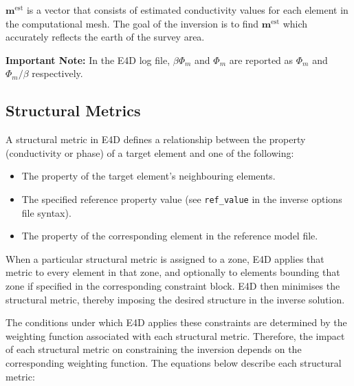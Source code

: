 \documentclass[a4paper,12pt]{article}
\begin{document}
\(\mathbf{m}^{\text{est}}\) is a vector that consists of estimated conductivity values for each element in the computational mesh. The goal of the inversion is to find \(\mathbf{m}^{\text{est}}\) which accurately reflects the earth of the survey area.

\begin{framed}
\noindent \textbf{Important Note:} In the E4D log file, $\beta \Phi_m$ and $\Phi_m$ are reported as $\Phi_m$ and $\Phi_m / \beta$ respectively.
\end{framed}

\subsection{Structural Metrics} \label{structural_metrics}

A structural metric in E4D defines a relationship between the property (conductivity or phase) of a target element and one of the following:

\begin{itemize}
    \item The property of the target element's neighbouring elements.
    \item The specified reference property value (see \texttt{ref\_value} in the inverse options file syntax).
    \item The property of the corresponding element in the reference model file.
\end{itemize}

When a particular structural metric is assigned to a zone, E4D applies that metric to every element in that zone, and optionally to elements bounding that zone if specified in the corresponding constraint block. E4D then minimises the structural metric, thereby imposing the desired structure in the inverse solution.

The conditions under which E4D applies these constraints are determined by the weighting function associated with each structural metric. Therefore, the impact of each structural metric on constraining the inversion depends on the corresponding weighting function. The equations below describe each structural metric:
\end{document}
